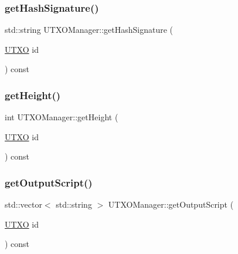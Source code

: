 \subsubsection{\texorpdfstring{get\+Hash\+Signature()}{getHashSignature()}}
{\footnotesize\ttfamily std\+::string U\+T\+X\+O\+Manager\+::get\+Hash\+Signature (\begin{DoxyParamCaption}\item[{\mbox{\hyperlink{utxo_8hpp_a19091d002da03ec92277e19295ac4540}{U\+T\+XO}}}]{id }\end{DoxyParamCaption}) const}

\mbox{\label{classUTXOManager_a4ae666af31dc1be4bd160a179aeef2ce}} 
\subsubsection{\texorpdfstring{get\+Height()}{getHeight()}}
{\footnotesize\ttfamily int U\+T\+X\+O\+Manager\+::get\+Height (\begin{DoxyParamCaption}\item[{\mbox{\hyperlink{utxo_8hpp_a19091d002da03ec92277e19295ac4540}{U\+T\+XO}}}]{id }\end{DoxyParamCaption}) const}

\mbox{\label{classUTXOManager_a156c895274840fa2c6c93fead39b38e5}} 
\subsubsection{\texorpdfstring{get\+Output\+Script()}{getOutputScript()}}
{\footnotesize\ttfamily std\+::vector$<$ std\+::string $>$ U\+T\+X\+O\+Manager\+::get\+Output\+Script (\begin{DoxyParamCaption}\item[{\mbox{\hyperlink{utxo_8hpp_a19091d002da03ec92277e19295ac4540}{U\+T\+XO}}}]{id }\end{DoxyParamCaption}) const}

\mbox{\label{classUTXOManager_ae326f42b81d5d21b5232b715e7cef076}} 
